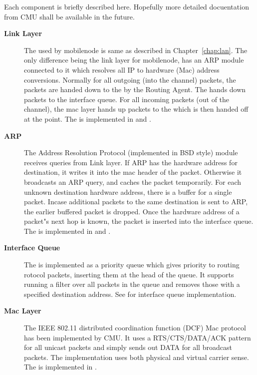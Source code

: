 Each component is briefly described here. Hopefully more detailed docuentation from CMU shall be available in the future.
\begin{description}
\item[{\bf Link Layer}] The  used by mobilenode is same as described in Chapter~\ref{chap:lan}. The only difference being the link layer for mobilenode, has an ARP module connected to it which resolves all IP to hardware (Mac) address conversions. Normally for all outgoing (into the channel) packets, the packets are handed down to the  by the Routing Agent. The  hands down packets to the interface queue. For all incoming packets (out of the channel), the mac layer hands up packets to the  which is then handed off at the  point. The  is implemented in  and .

\item [{\bf ARP}] The Address Resolution Protocol (implemented in BSD style) module receives queries from Link layer. If ARP has the hardware address for destination, it writes it into the mac header of the packet. Otherwise it broadcasts an ARP query, and caches the packet temporarily. For each unknown destination hardware address, there is a buffer for a single packet. Incase additional packets to the same destination is sent to ARP, the earlier buffered packet is dropped. Once the hardware address of a packet"s next hop is known, the packet is inserted into the interface queue. The  is implemented in  and .

\item[{\bf Interface Queue}] The  is implemented as a priority queue which gives priority to routing 
rotocol packets, inserting them at the head of the queue. It supports
running a filter over all packets in the queue and removes those with
a specified destination address. See  for 
interface queue implementation.

\item[{\bf Mac Layer}] The IEEE 802.11 distributed coordination 
function (DCF) Mac protocol has been implemented by CMU. It uses a 
RTS/CTS/DATA/ACK pattern for all unicast packets and simply sends out
 DATA for all broadcast packets. The implementation uses both 
physical and virtual carrier sense. The  is implemented in .


\end{description}
